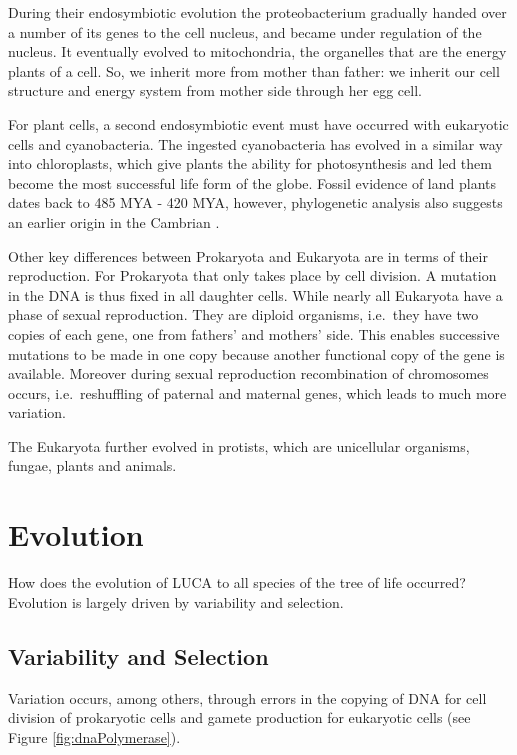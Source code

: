 \documentclass[
  11pt,
]{book}
\begin{document}
During their endosymbiotic evolution the proteobacterium gradually handed over a number of its genes to the cell nucleus, and became under regulation of the nucleus. It eventually evolved to mitochondria, the organelles that are the energy plants of a cell. So, we inherit more from mother than father: we inherit our cell structure and energy system from mother side through her egg cell.

For plant cells, a second endosymbiotic event must have occurred with eukaryotic cells and cyanobacteria. The ingested cyanobacteria has evolved in a similar way into chloroplasts, which give plants the ability for photosynthesis and led them become the most successful life form of the globe. Fossil evidence of land plants dates back to 485 MYA - 420 MYA, however, phylogenetic analysis also suggests an earlier origin in the Cambrian \citep{StrotherFoster2021}.

Other key differences between Prokaryota and Eukaryota are in terms of their reproduction.
For Prokaryota that only takes place by cell division. A mutation in the DNA is thus fixed in all daughter cells. While nearly all Eukaryota have a phase of sexual reproduction. They are diploid organisms, i.e.~they have two copies of each gene, one from fathers' and mothers' side. This enables successive mutations to be made in one copy because another functional copy of the gene is available. Moreover during sexual reproduction recombination of chromosomes occurs, i.e.~reshuffling of paternal and maternal genes, which leads to much more variation.

The Eukaryota further evolved in protists, which are unicellular organisms, fungae, plants and animals.

\newpage

\hypertarget{evolution}{%
\section{Evolution}\label{evolution}}

How does the evolution of LUCA to all species of the tree of life occurred?
Evolution is largely driven by variability and selection.

\hypertarget{variability-and-selection}{%
\subsection{Variability and Selection}\label{variability-and-selection}}

Variation occurs, among others, through errors in the copying of DNA for cell division of prokaryotic cells and gamete production for eukaryotic cells (see Figure \ref{fig:dnaPolymerase}).
\end{document}
